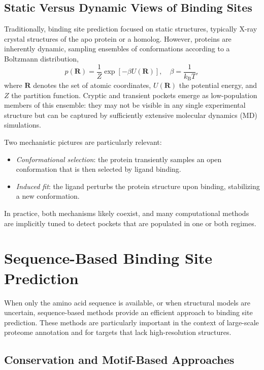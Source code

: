 \documentclass[12pt,a4paper]{article}
\begin{document}
\subsection{Static Versus Dynamic Views of Binding Sites}

Traditionally, binding site prediction focused on static structures, typically X-ray crystal structures of the apo protein or a homolog. However, proteins are inherently dynamic, sampling ensembles of conformations according to a Boltzmann distribution,
\begin{equation}
p(\mathbf{R}) = \frac{1}{Z} \exp \left[ - \beta U(\mathbf{R}) \right], \quad \beta = \frac{1}{k_{\mathrm{B}} T},
\label{eq:boltzmann_ensemble}
\end{equation}
where \(\mathbf{R}\) denotes the set of atomic coordinates, \(U(\mathbf{R})\) the potential energy, and \(Z\) the partition function. Cryptic and transient pockets emerge as low-population members of this ensemble: they may not be visible in any single experimental structure but can be captured by sufficiently extensive molecular dynamics (MD) simulations.\cite{CH5_Kuzmanic2020,CH5_Gasparikova2025}

Two mechanistic pictures are particularly relevant:
\begin{itemize}
    \item \emph{Conformational selection}: the protein transiently samples an open conformation that is then selected by ligand binding.
    \item \emph{Induced fit}: the ligand perturbs the protein structure upon binding, stabilizing a new conformation.
\end{itemize}
In practice, both mechanisms likely coexist, and many computational methods are implicitly tuned to detect pockets that are populated in one or both regimes.

\section{Sequence-Based Binding Site Prediction}

When only the amino acid sequence is available, or when structural models are uncertain, sequence-based methods provide an efficient approach to binding site prediction. These methods are particularly important in the context of large-scale proteome annotation and for targets that lack high-resolution structures.

\subsection{Conservation and Motif-Based Approaches}
\end{document}
